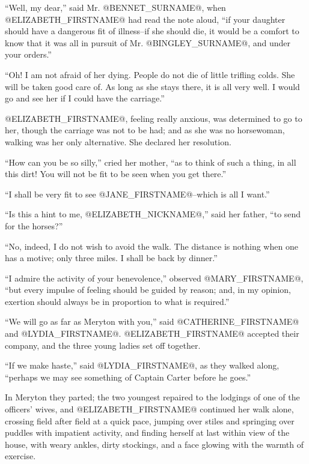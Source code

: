 ``Well, my dear,'' said Mr. @BENNET_SURNAME@, when @ELIZABETH_FIRSTNAME@ had read the note
aloud, ``if your daughter should have a dangerous fit of illness--if she
should die, it would be a comfort to know that it was all in pursuit of
Mr. @BINGLEY_SURNAME@, and under your orders.''

``Oh! I am not afraid of her dying. People do not die of little trifling
colds. She will be taken good care of. As long as she stays there, it is
all very well. I would go and see her if I could have the carriage.''

@ELIZABETH_FIRSTNAME@, feeling really anxious, was determined to go to her, though
the carriage was not to be had; and as she was no horsewoman, walking
was her only alternative. She declared her resolution.

``How can you be so silly,'' cried her mother, ``as to think of such a
thing, in all this dirt! You will not be fit to be seen when you get
there.''

``I shall be very fit to see @JANE_FIRSTNAME@--which is all I want.''

``Is this a hint to me, @ELIZABETH_NICKNAME@,'' said her father, ``to send for the
horses?''

``No, indeed, I do not wish to avoid the walk. The distance is nothing
when one has a motive; only three miles. I shall be back by dinner.''

``I admire the activity of your benevolence,'' observed @MARY_FIRSTNAME@, ``but every
impulse of feeling should be guided by reason; and, in my opinion,
exertion should always be in proportion to what is required.''

``We will go as far as Meryton with you,'' said @CATHERINE_FIRSTNAME@ and @LYDIA_FIRSTNAME@.
@ELIZABETH_FIRSTNAME@ accepted their company, and the three young ladies set off
together.

``If we make haste,'' said @LYDIA_FIRSTNAME@, as they walked along, ``perhaps we may
see something of Captain Carter before he goes.''

In Meryton they parted; the two youngest repaired to the lodgings of one
of the officers' wives, and @ELIZABETH_FIRSTNAME@ continued her walk alone, crossing
field after field at a quick pace, jumping over stiles and springing
over puddles with impatient activity, and finding herself at last
within view of the house, with weary ankles, dirty stockings, and a face
glowing with the warmth of exercise.

